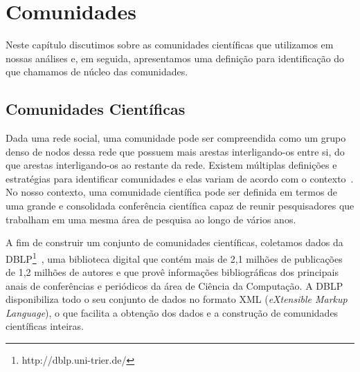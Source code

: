 \chapter{Comunidades}\label{comunidades}
Neste capítulo discutimos sobre as comunidades científicas que utilizamos em nossas análises e, em seguida, apresentamos
uma definição para identificação do que chamamos de núcleo das comunidades.

\section{Comunidades Científicas}

Dada uma rede social, uma comunidade pode ser compreendida como um grupo denso de nodos dessa rede que possuem mais arestas 
interligando-os entre si, do que arestas interligando-os ao restante da rede. Existem múltiplas definições e estratégias 
para identificar comunidades e elas variam de acordo com o contexto~\citep{Kleinberg2008,Leskovec2010}. No nosso contexto, 
uma comunidade científica pode ser definida em termos de uma grande e consolidada conferência científica capaz de reunir 
pesquisadores que trabalham em uma mesma área de pesquisa ao longo de vários anos.
 
A fim de construir um conjunto de comunidades científicas, coletamos dados da DBLP\footnote{http://dblp.uni-trier.de/}~\citep{Ley2009}, 
uma biblioteca digital que contém mais de 2,1 milhões de publicações de 1,2 milhões de autores e que provê informações 
bibliográficas dos principais anais de conferências e periódicos da área de Ciência da Computação. A DBLP disponibiliza 
todo o seu conjunto de dados no formato XML (\textit{eXtensible Markup Language}), o que facilita a obtenção dos dados e a 
construção de comunidades científicas inteiras.

